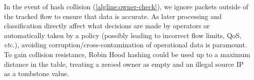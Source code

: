 \vspace{-0.25cm}
In the event of hash collision (\cref{algline:owner-check}), we ignore packets outside of the tracked flow to ensure that data is accurate.
As later processing and classification directly affect what decisions are made by operators or automatically taken by a policy (possibly leading to incorrect flow limits, QoS, \emph{etc.}), avoiding corruption/cross-contamination of operational data is paramount.
To gain collision resistance, Robin Hood hashing could be used up to a maximum distance in the table, treating a zeroed owner as empty and an illegal source IP as a tombstone value.

\begin{table}
    \centering
    \caption{Register map (Datatype, Amount) for an $h$-bit hash.}
    \label{tab:registers}
\end{table}


